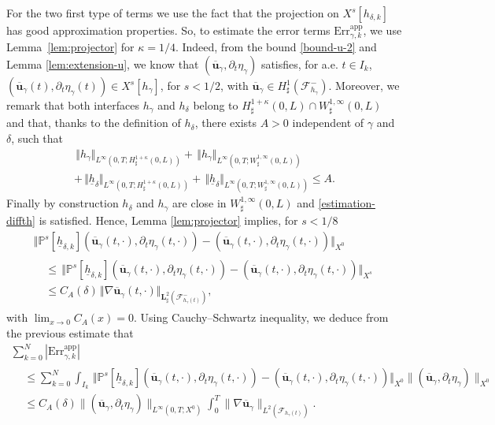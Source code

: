 \documentclass[JEP,XML,SOM,Unicode,NoFloatCountersInSection]{cedram}
\let\mathcal\mathscr
\newcommand{\app}{\mathrm{app}}
\newcommand{\Err}{\mathrm{Err}}
\theoremstyle{remark}
\theoremstyle{definition}
\newcommand{\norme}[1]{\,\Vert #1\Vert}
\newcommand{\ug}{\boldsymbol{u}}
\newcommand{\BS}[1]{\boldsymbol{#1}}
\newcommand{\hb}{{\underline{h}}}
\begin{document}
For the two first type of terms we use the fact that the projection on $X^s[h_{\delta, k}]$ has good approximation properties. So, to estimate the error terms $\Err^{\app}_{\gamma,k}$, we use Lemma~\ref{lem:projector} for $\kappa=1/4$. Indeed, from the bound \eqref{bound-u-2} and Lemma \eqref{lem:extension-u}, we know that $(\overline{\ug}_{\gamma},\partial_t \eta_\gamma)$ satisfies, for a.e. $t \in I_k$, $(\overline{\ug}_{\gamma}(t),\partial_t \eta_{\gamma}(t)) \in X^s[h_{\gamma}]$, for $s<1/2$, with $\overline{\ug}_{\gamma} \in H_\sharp^1(\mathcal F^-_{h_{\gamma}})$. Moreover, we remark that both interfaces $h_{\gamma}$ and $h_\delta$ belong to $H^{1+\kappa}_{\sharp}(0,L) \cap W_\sharp^{1,\infty}(0,L)$ and that, thanks to the definition of $h_\delta$, there exists $A >0$ independent of $\gamma$ and $\delta$, such that\vspace*{-5pt}
\begin{multline*}
\norme{h_{\gamma}}_{L^{\infty}(0,T;H^{1+\kappa}_{\sharp}(0,L))}+\norme{h_{\gamma}}_{L^{\infty}(0,T;W^{1,\infty}_{\sharp}(0,L))} \\
+\norme{\hb_{\delta}}_{L^{\infty}(0,T;H^{1+\kappa}_{\sharp}(0,L))}+\norme{\hb_{\delta}}_{L^{\infty}(0,T;W^{1,\infty}_{\sharp}(0,L))}\leq A.
\end{multline*}
Finally by construction $h_\delta$ and $h_\gamma$ are close in $W^{1, \infty}_\sharp(0, L)$ and \eqref{estimation-diffth} is satisfied.
Hence,
Lemma \ref{lem:projector} implies, for $s<1/8$\vspace*{-3pt}
\begin{multline*}
\norme{\mathbb{P}^{s}[\hb_{\delta, k}](\overline{\ug}_{\gamma}(t,\cdot),\partial_{t}\eta_{\gamma}(t,\cdot)) -(\overline{\ug}_{\gamma}(t,\cdot),\partial_{t}\eta_{\gamma}(t,\cdot))}_{X^0} \\
\begin{aligned}
&\leq\norme{\mathbb{P}^{s}[\hb_{\delta, k}](\overline{\ug}_{\gamma}(t,\cdot),\partial_{t}\eta_{\gamma}(t,\cdot)) -(\overline{\ug}_{\gamma}(t,\cdot),\partial_{t}\eta_{\gamma}(t,\cdot))}_{X^s}\\
&\leq C_{A}(\delta)\norme{\nabla \overline{\ug}_{\gamma}(t,\cdot)}_{\BS{L}^{2}_{\sharp}(\mathcal{F}^{-}_{h_{\gamma}(t)})},
\end{aligned}
\end{multline*}
with $\lim_{x\to 0} C_A(x)=0$.
Using Cauchy--Schwartz inequality, we deduce from the previous estimate that\vspace*{-5pt}
\begin{multline*}
\sum_{k=0}^N |\Err_{\gamma,k}^{\app}| \\[-8pt]
\begin{aligned}
& \leq \sum_{k=0}^N \int_{I_k} \norme{\mathbb{P}^{s}[\hb_{\delta, k}](\overline{\ug}_{\gamma}(t,\cdot),\partial_{t}\eta_{\gamma}(t,\cdot)) -(\overline{\ug}_{\gamma}(t,\cdot),\partial_{t}\eta_{\gamma}(t,\cdot))}_{X^0}
\|(\overline{\ug}_{\gamma},\partial_t \eta_{\gamma})\|_{X^0} \\
& \leq C_A({\delta})\|(\overline{\ug}_{\gamma},\partial_t \eta_{\gamma})\|_{L^\infty(0, T;X^0)} \int_0^T \|\nabla \overline{\ug}_{\gamma}\|_{L^2(\mathcal F_{h_{\gamma}(t)})}.
\end{aligned}
\end{multline*}
\end{document}

